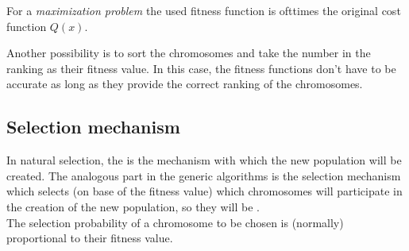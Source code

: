 For a \emph{maximization problem} the used fitness function is ofttimes the original cost function $Q(x)$.

Another possibility is to sort the chromosomes and take the number in the ranking as their fitness value. In this case, the fitness functions don't have to be accurate as long as they provide the correct ranking of the chromosomes.


\subsection{Selection mechanism}
In natural selection, the  is the mechanism with which the new population will be created. The analogous part in the generic algorithms is the selection mechanism which selects (on base of the fitness value) which chromosomes will participate in the creation of the new population, so they will be .\\
The selection probability of a chromosome to be chosen is (normally) proportional to their fitness value. %

